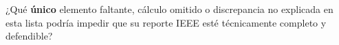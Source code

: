 \documentclass[11pt, a4paper]{article}
\begin{document}
\vspace{0.4cm}
\begin{tcolorbox}[colback=red!5!white, colframe=red!70!black, title=\textbf{Pregunta Final de Control de Calidad}]
¿Qué \textbf{único} elemento faltante, cálculo omitido o discrepancia no explicada en esta lista podría impedir que su reporte IEEE esté técnicamente completo y defendible?
\vspace{1cm}
\end{tcolorbox}
\end{document}
